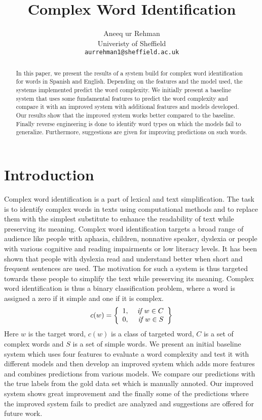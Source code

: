 \documentclass[10pt,a4paper]{article}
\title{Complex Word Identification}
\author{Aneeq ur Rehman \\
  Univeristy of Sheffield  \\
  {\tt aurrehman1@sheffield.ac.uk} }
\date{}
\begin{document}
\maketitle




\begin{abstract}
In this paper, we present the results of a system build for complex word identification for words in Spanish and English. Depending on the features and the model used, the systems implemented predict the word complexity. We initially present a baseline system that uses some fundamental features to predict the word complexity and compare it with an improved system with additional features and models developed. Our results show that the improved system works better compared to the baseline. Finally reverse engineering is done to identify word types on which the models fail to generalize. Furthermore, suggestions are given for improving predictions on such words.
\end{abstract}

\section{Introduction}

Complex word identification is a part of lexical and text simplification. The task is to identify complex words in texts using computational methods \cite{zampieri2017complex} and to replace them with the simplest substitute to enhance the readability of text while preserving its meaning. Complex word identification targets a broad range of audience like people with aphasia, children, nonnative speaker, dyslexia  \cite{P16-1001}  or people with various cognitive and reading impairments or low literacy levels.  It has been shown that people with dyslexia read and understand better when short and frequent sentences are used. The motivation for such a system is thus targeted towards these people to simplify the text while preserving its meaning. Complex word identification is thus a binary classification problem, where a word is assigned a zero if it simple and one if it is complex.\cite{[1]} 
  \[
    c(w) = \left\{\begin{array}{lr}
        1, & \text{ \it if } w \in C\\
        0, & \text{ \it if } w \in S\\
        \end{array}\right\}
  \]
Here $w$ is the target word, $c(w)$ is a class of targeted word, $C$ is a set of complex words and $S$ is a set of simple words. We present an initial baseline system which uses four features to evaluate a word complexity and test it with different models and then develop an improved system which adds more features and combines predictions from various models. We compare our predictions with the true labels from the gold data set which is manually annoted. Our improved system shows great improvement and the finally some of the predictions where the improved system fails to predict are analyzed and suggestions are offered for future work.
\end{document}
